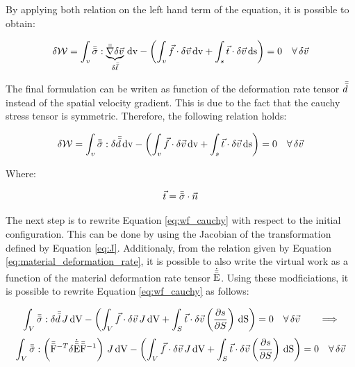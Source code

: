 By applying both relation on the left hand term of the equation, it is possible to obtain:

\begin{equation*}
    \delta \mathcal{W} = \int_v \bar{\bar{\sigma}} : \underbrace{\bar{\bar{\nabla}} \delta \vec{v}}_{\delta \bar{\bar{\ell}}} \, \mathrm{dv} - \left( \int_v \vec{f} \cdot \delta \vec{v} \, \mathrm{dv} + \int_s \vec{t} \cdot \delta \vec{v} \, \mathrm{ds} \right) = 0 \quad \forall \, \delta \vec{v}
\end{equation*}

The final formulation can be writen as function of the deformation rate tensor $\bar{\bar{d}}$ instead of the spatial velocity gradient. This is due to the fact that the cauchy stress tensor is symmetric. Therefore, the following relation holds:

\begin{equation} \label{eq:wf_cauchy}
    \delta \mathcal{W} = \int_v \bar{\bar{\sigma}} : \delta \bar{\bar{d}} \, \mathrm{dv} - \left( \int_v \vec{f} \cdot \delta \vec{v} \, \mathrm{dv} + \int_s \vec{t} \cdot \delta \vec{v} \, \mathrm{ds} \right) = 0 \quad \forall \, \delta \vec{v}
\end{equation}

Where:

\begin{equation*}
    \vec{t} = \bar{\bar{\sigma}} \cdot \vec{n}
\end{equation*}

The next step is to rewrite Equation \ref{eq:wf_cauchy} with respect to the initial configuration. This can be done by using the Jacobian of the transformation defined by Equation \ref{eq:J}. Additionaly, from the relation given by Equation \ref{eq:material_deformation_rate}, it is possible to also write the virtual work as a function of the material deformation rate tensor $\dot{\bar{\bar{\mathrm{E}}}}$. Using these modficiations, it is possible to rewrite Equation \ref{eq:wf_cauchy} as follows:

\begin{equation*}
    \int_V \bar{\bar{\sigma}} : \delta \bar{\bar{d}} \, J \, \mathrm{dV} - \left( \int_V \vec{f} \cdot \delta \vec{v} \, J \, \mathrm{dV} + \int_S \vec{t} \cdot \delta \vec{v} \left( \frac{\partial s}{\partial S} \right)\, \mathrm{dS} \right) = 0 \quad \forall \, \delta \vec{v} \qquad \Longrightarrow
\end{equation*}
\begin{equation*}
    \int_V \bar{\bar{\sigma}} : \left( \bar{\bar{\mathrm{F}}}^{-T} \delta \dot{\bar{\bar{\mathrm{E}}}} \bar{\bar{\mathrm{F}}}^{-1} \right) \, J \, \mathrm{dV} - \left( \int_V \vec{f} \cdot \delta \vec{v} \, J \, \mathrm{dV} + \int_S \vec{t} \cdot \delta \vec{v} \left( \frac{\partial s}{\partial S} \right)\, \mathrm{dS} \right) = 0 \quad \forall \, \delta \vec{v} 
\end{equation*}


